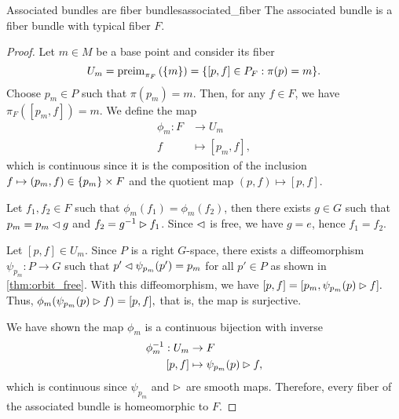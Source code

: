 \begin{proposition}{Associated bundles are fiber bundles}{associated_fiber}
    The associated bundle  is a fiber bundle with typical fiber \(F\).
\end{proposition}
\begin{proof}
    Let \(m \in M\) be a base point and consider its fiber
    \begin{equation*}
        U_m = \operatorname{preim}_{\pi_F}{\left(\{m\}\right)} = \{[p,f] \in P_F : \pi(p) = m\}.
    \end{equation*}
    Choose \(p_m \in P\) such that \(\pi(p_m) = m\). Then, for any \(f \in F\), we have \(\pi_F([p_m, f]) = m\). We define the map
    \begin{align*}
        \phi_m : F &\to U_m\\
                 f &\mapsto [p_m,f],
    \end{align*}
    which is continuous since it is the composition of the inclusion \(f \mapsto (p_m, f) \in \{p_m\} \times F\) and the quotient map \((p,f) \mapsto [p,f]\). 

    Let \(f_1, f_2 \in F\) such that \(\phi_m(f_1) = \phi_m(f_2)\), then there exists \(g \in G\) such that \(p_m = p_m \mathbin{\vartriangleleft} g\) and \(f_2 = g^{-1} \mathbin{\vartriangleright} f_1\). Since \(\mathbin{\vartriangleleft}\) is free, we have \(g = e\), hence \(f_1 = f_2\).

    Let \([p, f] \in U_m\). Since \(P\) is a right \(G\)-space, there exists a diffeomorphism \(\psi_{p_m} : P \to G\) such that \(p' \mathbin{\vartriangleleft} \psi_{p_m}(p') = p_m\) for all \(p' \in P\) as shown in \cref{thm:orbit_free}. With this diffeomorphism, we have \([p,f] = [p_m, \psi_{p_m}(p) \mathbin{\vartriangleright} f].\) Thus, \(\phi_m(\psi_{p_m}(p) \mathbin{\vartriangleright} f) = [p,f],\) that is, the map is surjective.

    We have shown the map \(\phi_m\) is a continuous bijection with inverse
    \begin{align*}
        \phi_m^{-1} : U_m &\to F\\
                    [p,f] &\mapsto \psi_{p_m}(p) \mathbin{\vartriangleright} f,
    \end{align*}
    which is continuous since \(\psi_{p_m}\) and \(\mathbin{\vartriangleright}\) are smooth maps. Therefore, every fiber of the associated bundle is homeomorphic to \(F.\)
\end{proof}

